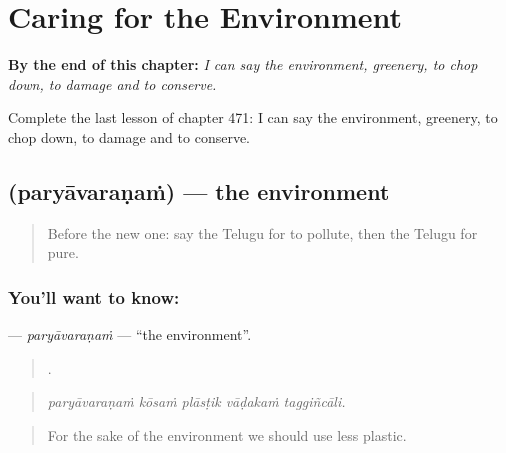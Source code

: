 
\chapter{Caring for the Environment}
\label{ch:te-caring-for-the-environment}

\begin{chapteropening}
\textbf{By the end of this chapter:} \emph{I can say the environment, greenery, to chop down, to damage and to conserve.}

Complete the last lesson of chapter 471: I can say the environment, greenery, to chop down, to damage and to conserve.
\end{chapteropening}

\section[\texorpdfstring{\te{పర్యావరణం} (paryāvaraṇaṁ)}{పర్యావరణం (paryāvaraṇaṁ)}]{ (paryāvaraṇaṁ) — the environment}

\label{lesson:TE-C471-paryavaranam}



\begin{quote}
Before the new one: say the Telugu for to pollute, then the Telugu for pure.
\end{quote}

\subsection*{You'll want to know: }
\textbf{} — \emph{paryāvaraṇaṁ} — \textquotedblleft{}the environment\textquotedblright{}.

\begin{quote}
    .
\end{quote}

\begin{quote}
\emph{paryāvaraṇaṁ kōsaṁ plāsṭik vāḍakaṁ taggiñcāli.}
\end{quote}

\begin{quote}
For the sake of the environment we should use less plastic.
\end{quote}

